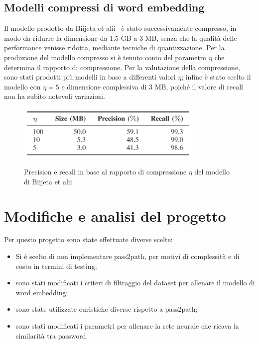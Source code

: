 \subsection{Modelli compressi di word embedding}
Il modello prodotto da Biijeta et alii~\cite{biijeta} è stato successivamente compresso, in modo da ridurre la dimensione da 1.5 GB a 3 MB, senza che la qualità delle performance venisse ridotta, mediante tecniche di quantizzazione.
Per la produzione del modello compresso si è tenuto conto del parametro $\eta$ che determina il rapporto di compressione. Per la valutazione della compressione, sono stati prodotti più modelli in base a differenti valori $\eta$; infine è stato scelto il modello con $\eta=5$ e dimensione complessiva di 3 MB, poiché il valore di recall non ha subito notevoli variazioni.
\begin{figure}[h]
    \centering
    \includegraphics[width=9cm]{./immagini/compressed_model.png}
    \label{compressed_model}
    \caption{Precision e recall in base al rapporto di compressione $\eta$ del modello di Biijeta et alii~\cite{biijeta}}
\end{figure}
\section{Modifiche e analisi del progetto}

Per questo progetto sono state effettuate diverse scelte:

\begin{itemize}
    \item Si è scelto di non implementare pass2path, per motivi di complessità e di costo in termini di testing;
    \item sono stati modificati i criteri di filtraggio del dataset per allenare il modello di word embedding;
    \item sono state utilizzate euristiche diverse rispetto a pass2path;
    \item sono stati modificati i parametri per allenare la rete neurale che ricava la similarità tra password.
\end{itemize}
